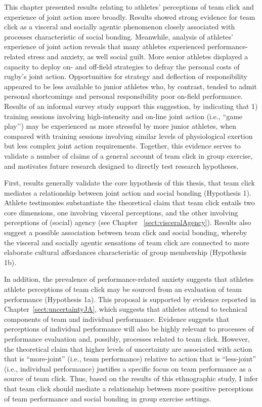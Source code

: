 \begin{CJK}{UTF8}{gbsn}
This chapter presented results relating to athletes’ perceptions of team click and experience of joint action more broadly.  Results showed strong evidence for team click as a visceral and socially agentic phenomenon closely associated with processes characteristic of social bonding.  Meanwhile, analysis of athletes’ experience of joint action reveals that many athletes experienced performance-related stress and anxiety, as well social guilt.  More senior athletes displayed a capacity to deploy on- and off-field strategies to defray the personal costs of rugby's joint action.  Opportunities for strategy and deflection of responsibility appeared to be less available to junior athletes who, by contrast, tended to admit personal shortcomings and personal responsibility poor on-field performance.  Results of an informal survey study support this suggestion, by indicating that 1) training sessions involving high-intensity and on-line joint action (i.e., ``game play’')  may be experienced as more stressful by more junior athletes, when compared with training sessions involving similar levels of physiological exertion but less complex joint action requirements. Together, this evidence serves to validate a number of claims of a general account of team click in group exercise, and motivates future research designed to directly test research hypotheses.

First, results generally validate the core hypothesis of this thesis, that team click mediates a relationship between joint action and social bonding (Hypothesis 1).  Athlete testimonies substantiate the theoretical claim that team click entails two core dimensions, one involving visceral perceptions, and the other involving perceptions of (social) agency (see Chapter ~\ref{sect:visceralAgency}).  Results also suggest a possible association between team click and social bonding, whereby the visceral and socially agentic sensations of team click are connected to more elaborate cultural affordances characteristic of group membership (Hypothesis 1b).

In addition, the prevalence of performance-related anxiety suggests that athletes athlete perceptions of team click may be sourced from an evaluation of team performance (Hypothesis 1a).  This proposal is supported by evidence reported in Chapter~\ref{sect:uncertaintyJA}, which suggests that athletes attend to technical components of team and individual performance. Evidence suggests that perceptions of individual performance will also be highly relevant to processes of performance evaluation and, possibly, processes related to team click.  However, the theoretical claim that higher levels of uncertainty are associated with action that is ``more-joint'' (i.e., team performance) relative to action that is ``less-joint'' (i.e., individual performance) justifies a specific focus on team performance as a source of team click. Thus, based on the results of this ethnographic study, I infer that team click should mediate a relationship between more positive perceptions of team performance and social bonding in group exercise settings.


\end{CJK}
